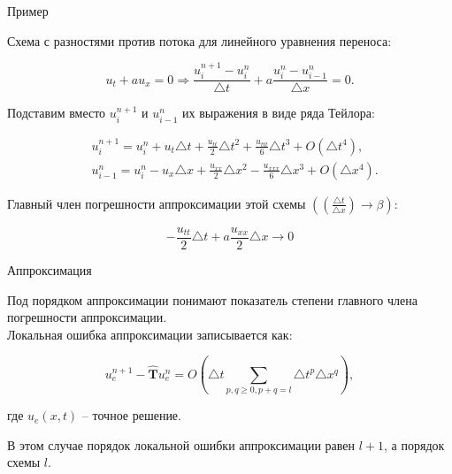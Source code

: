 \documentclass[10pt,xcolor=pst,aspectratio=169]{beamer}
\begin{document}
\begin{frame}{Пример}

    \transdissolve[duration=0.1]
    \justifying
    \large

    Схема с разностями против потока для линейного уравнения переноса:

    \[
        u_{t} + a u_{x} = 0 \Rightarrow \frac{u^{n + 1}_{i} - u^{n}_{i}}{\triangle t} + a \frac{u^{n}_{i} - u^{n}_{i - 1}}{\triangle x} = 0.
    \]    

    Подставим вместо $u^{n + 1}_{i}$ и $u^{n}_{i - 1}$ их выражения в виде ряда Тейлора:

    \[
		\begin{split}
			&u^{n + 1}_{i} = u^{n}_{i} + u_{t} \triangle t + \frac{u_{tt}}{2} \triangle t^{2} + \frac{u_{ttt}}{6} \triangle t^{3} + O(\triangle t^{4}),\\
			&u^{n}_{i - 1} = u^{n}_{i} - u_{x} \triangle x + \frac{u_{xx}}{2} \triangle x^{2} - \frac{u_{xxx}}{6} \triangle x^{3} + O(\triangle x^{4}).
		\end{split}
	\]

    Главный член погрешности аппроксимации этой схемы $\left( \left( \frac{\triangle t}{\triangle x} \right) \rightarrow \beta \right)$:

    \[
        -\frac{u_{tt}}{2} \triangle t + a \frac{u_{xx}}{2} \triangle x \rightarrow 0
    \]

\end{frame}

\begin{frame}{Аппроксимация}

	\transdissolve[duration=0.1]
	\justifying
	\large

    Под порядком аппроксимации понимают показатель степени главного члена погрешности аппроксимации. \\

	Локальная ошибка аппроксимации записывается как:

	\[
		u^{n + 1}_{e} - \hat{\textbf{T}} u^{n}_{e} = O \left( \triangle t \sum_{p , q \geq 0, p + q = l} \triangle t^{p} \triangle x^{q} \right),
	\]

    где $u_{e} (x, t)$ -- точное решение.

	В этом случае порядок локальной ошибки аппроксимации равен $l + 1$, а порядок схемы $l$.

\end{frame}
\end{document}
